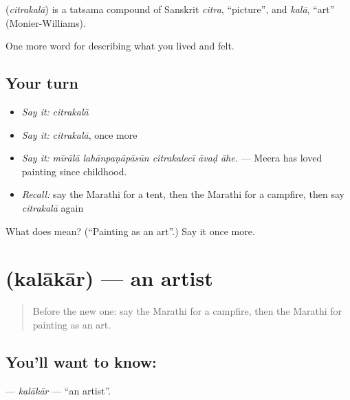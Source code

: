 \begin{cousinweb}
\textbf{} (\emph{citrakalā}) is a tatsama compound of Sanskrit \emph{citra}, \textquotedblleft{}picture\textquotedblright{}, and \emph{kalā}, \textquotedblleft{}art\textquotedblright{} (Monier-Williams).
\end{cousinweb}

\begin{grammarlens}[title={What you've built}]
One more word for describing what you lived and felt.
\end{grammarlens}

\subsection*{Your turn}
\begin{itemize}
\raggedright
  \item \emph{Say it:} \emph{citrakalā}
  \item \emph{Say it:} \emph{citrakalā}, once more
  \item \emph{Say it:} \emph{mīrālā lahānpaṇāpāsūn citrakalecī āvaḍ āhe.} — Meera has loved painting since childhood.
  \item \emph{Recall:} say the Marathi for a tent, then the Marathi for a campfire, then say \emph{citrakalā} again
\end{itemize}

\begin{tcolorbox}[breakable,colback=teal!4,colframe=teal!35!black,title={Before you move on}]
What does  mean? (\textquotedblleft{}Painting as an art\textquotedblright{}.) Say it once more.
\end{tcolorbox}
\section[\texorpdfstring{\mr{कलाकार} (kalākār)}{कलाकार (kalākār)}]{ (kalākār) — an artist}

\label{lesson:MR-C535-kalakar}



\begin{quote}
Before the new one: say the Marathi for a campfire, then the Marathi for painting as an art.
\end{quote}

\subsection*{You'll want to know: }
\textbf{} — \emph{kalākār} — \textquotedblleft{}an artist\textquotedblright{}.

